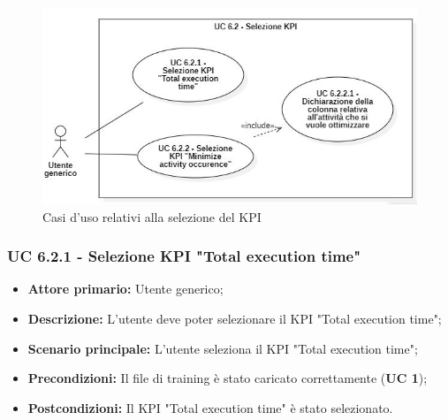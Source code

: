 \begin{figure}[H]
    \centering
    \includegraphics[scale=0.6]{immagini/usecase/cd4.JPG}
    \caption{Casi d'uso relativi alla selezione del KPI}
\end{figure}

\subsubsection{UC 6.2.1 - Selezione KPI "Total execution time"}
\begin{itemize}
	\item \textbf{Attore primario:} Utente generico;
	\item \textbf{Descrizione:} L'utente deve poter selezionare il KPI "Total execution time";
	\item \textbf{Scenario principale:} L'utente seleziona il KPI "Total execution time";
			
	\item \textbf{Precondizioni:} Il file di training è stato caricato correttamente (\textbf{UC 1});
	\item \textbf{Postcondizioni:} Il KPI "Total execution time" è stato selezionato.
\end{itemize}

%			

